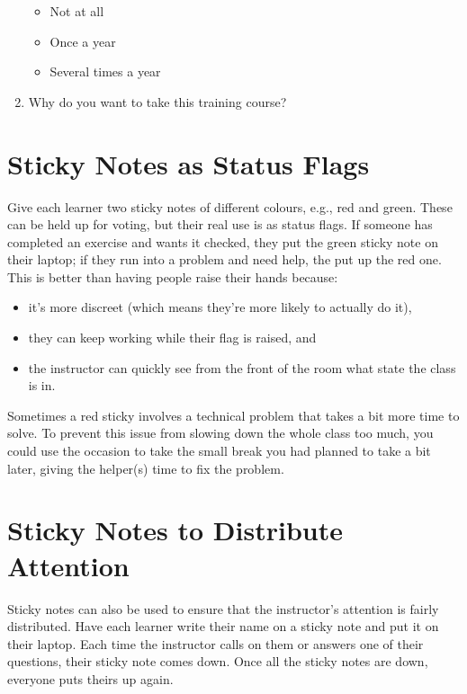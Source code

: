 \documentclass[10pt,statementpaper]{memoir}
\providecommand{\tightlist}{%
  \setlength{\itemsep}{0pt}\setlength{\parskip}{0pt}}
\begin{document}
\begin{enumerate}
  \begin{itemize}
  \tightlist
  \item
    Not at all
  \item
    Once a year
  \item
    Several times a year
  \end{itemize}
\item
  Why do you want to take this training course?
\end{enumerate}

\section{Sticky Notes as Status
Flags}\label{sticky-notes-as-status-flags}

Give each learner two sticky notes of different colours, e.g., red and
green. These can be held up for voting, but their real use is as status
flags. If someone has completed an exercise and wants it checked, they
put the green sticky note on their laptop; if they run into a problem
and need help, the put up the red one. This is better than having people
raise their hands because:

\begin{itemize}
\item
  it's more discreet (which means they're more likely to actually do
  it),
\item
  they can keep working while their flag is raised, and
\item
  the instructor can quickly see from the front of the room what state
  the class is in.
\end{itemize}

Sometimes a red sticky involves a technical problem that takes a bit
more time to solve. To prevent this issue from slowing down the whole
class too much, you could use the occasion to take the small break you
had planned to take a bit later, giving the helper(s) time to fix the
problem.

\section{Sticky Notes to Distribute
Attention}\label{sticky-notes-to-distribute-attention}

Sticky notes can also be used to ensure that the instructor's attention
is fairly distributed. Have each learner write their name on a sticky
note and put it on their laptop. Each time the instructor calls on them
or answers one of their questions, their sticky note comes down. Once
all the sticky notes are down, everyone puts theirs up again.
\end{document}

